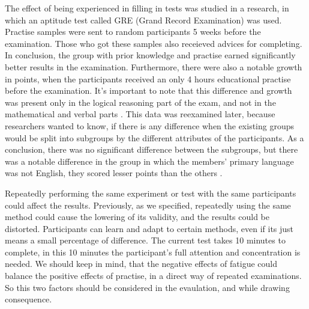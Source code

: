 The effect of being experienced in filling in tests was studied in a research, in which an aptitude test called GRE (Grand Record Examination) was used. Practise samples were sent to random participants 5 weeks before the examination. Those who got these samples also 
receieved advices for completing. In conclusion, the group with prior knowledge and practise earned significantly better results in the examination. Furthermore, there were also a notable growth in points, when the participants received an only 4 hours educational practise before the examination. It’s important to note that this difference and growth was present only in the logical reasoning part of the exam, and not in the mathematical and verbal parts 
\cite{PowersSwinton}. This data was reexamined later, because researchers wanted to know, if there is any difference when the existing groups would be split into subgroups by the different attributes of the participants. As a conclusion, there was no significant difference between the subgroups, but there was a notable difference in the group in which the members' primary language was not English, they scored lesser points than the others \cite{Powers86}.

Repeatedly performing the same experiment or test with the same participants could affect the results. Previously, as we specified, repeatedly using the same method could cause the lowering of its validity, and the results could be distorted. Participants can learn and adapt to certain methods, even if its just means a small percentage of difference. The current test takes 10 minutes to complete, in this 10 minutes the participant’s full attention and concentration is needed.  We should keep in mind, that the negative effects of fatigue could balance the positive effects of practise, in a direct way of repeated examinations. So this two factors should be considered in the evaulation, and while drawing consequence.



